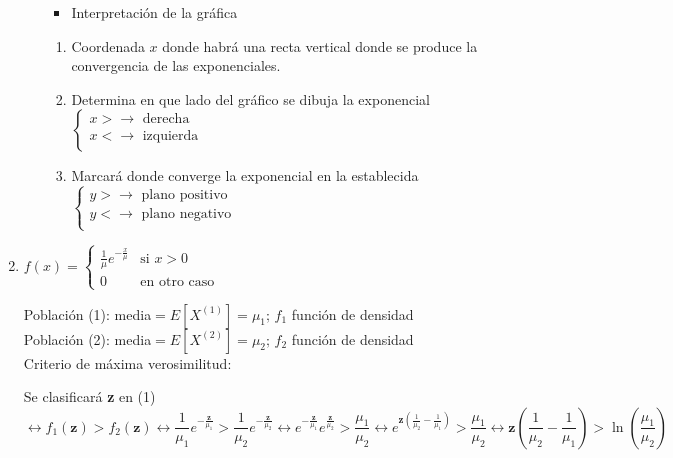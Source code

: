 \begin{enumerate}[label=\color{red}\textbf{\arabic*)}, leftmargin=*]
\begin{enumerate}[label=\color{red}\alph*)]
		\begin{itemize}[label=\color{red}\textbullet, leftmargin=*]
			\item \color{lightblue}Interpretación de la gráfica
		\end{itemize}
		\begin{enumerate}[label=\arabic*)]
			\item Coordenada $x$ donde habrá una recta vertical donde se produce la convergencia de las exponenciales.
			\item Determina en que lado del gráfico se dibuja la exponencial $\begin{cases}
			x>\longrightarrow\text{ derecha}\\
			x<\longrightarrow\text{ izquierda}\\
			\end{cases}$
			\item Marcará donde converge la exponencial en la  establecida$\begin{cases}
						y>\longrightarrow\text{ plano positivo}\\
						y<\longrightarrow\text{ plano negativo}\\
						\end{cases}$
		\end{enumerate}
	\end{enumerate}
	\item {}
	
		$f(x)=\begin{cases}
		\frac{1}{\mu}e^{-\frac{x}{\mu}} & \text{si }x>0\\
		0 & \text{en otro caso}
		\end{cases}$
		
		Población (1): media$=E[X^{(1)}]=\mu_1;\, f_1$ función de densidad\\
		Población (2): media$=E[X^{(2)}]=\mu_2;\, f_2$ función de densidad\\
		
		Criterio de máxima verosimilitud:
		
		Se clasificará \textbf{z} en (1)$\longleftrightarrow f_1(\mathbf{z})>f_2(\mathbf{z})\longleftrightarrow\dfrac{1}{\mu_1}e^{-\frac{\mathbf{z}}{\mu_1}}>\dfrac{1}{\mu_2}e^{-\frac{\mathbf{z}}{\mu_2}}\longleftrightarrow e^{-\frac{\mathbf{z}}{\mu_1}}e^{\frac{\mathbf{z}}{\mu_2}}>\dfrac{\mu_1}{\mu_2}\longleftrightarrow e^{\mathbf{z}\left(\frac{1}{\mu_2}-\frac{1}{\mu_1}\right)}>\dfrac{\mu_1}{\mu_2}\longleftrightarrow\mathbf{z}\left(\dfrac{1}{\mu_2}-\dfrac{1}{\mu_1}\right)>\ln\left(\dfrac{\mu_1}{\mu_2}\right)$
		

\end{enumerate}
